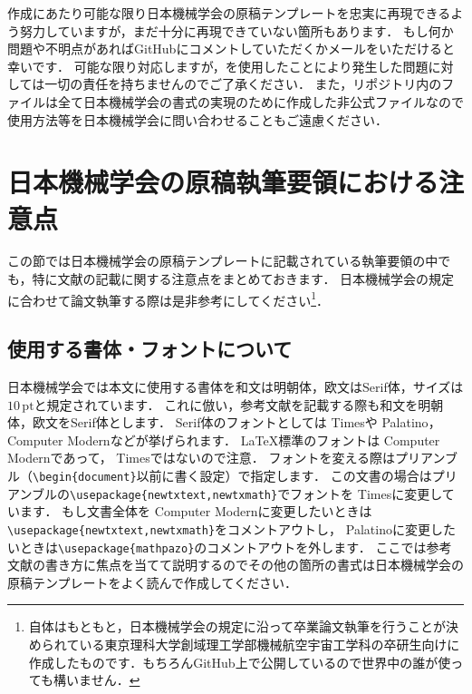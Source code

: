 \documentclass[a4paper,fleqn,uplatex,dvipdfmx]{jsarticle}
\begin{document}
\JSMErepos 作成にあたり可能な限り日本機械学会の原稿テンプレートを忠実に再現できるよう努力していますが，まだ十分に再現できていない箇所もあります．
もし何か問題や不明点があればGitHubにコメントしていただくかメールをいただけると幸いです．
可能な限り対応しますが，\JSMErepos を使用したことにより発生した問題に対しては一切の責任を持ちませんのでご了承ください．
また，\JSMErepos リポジトリ内のファイルは全て日本機械学会の書式の実現のために作成した非公式ファイルなので使用方法等を日本機械学会に問い合わせることもご遠慮ください．


\section{日本機械学会の原稿執筆要領における注意点}
\label{sec:caution}
この節では日本機械学会の原稿テンプレートに記載されている執筆要領の中でも，特に文献の記載に関する注意点をまとめておきます．
日本機械学会の規定に合わせて論文執筆する際は是非参考にしてください\footnote{\JSMErepos 自体はもともと，日本機械学会の規定に沿って卒業論文執筆を行うことが決められている東京理科大学創域理工学部機械航空宇宙工学科の卒研生向けに作成したものです．もちろんGitHub上で公開しているので世界中の誰が使っても構いません．}．

\subsection{使用する書体・フォントについて}
日本機械学会では本文に使用する書体を和文は明朝体，欧文はSerif体，サイズは$10\,\mathrm{pt}$と規定されています．
これに倣い，参考文献を記載する際も和文を明朝体，欧文をSerif体とします．
Serif体のフォントとしては{ Times}や{ Palatino}，{ Computer Modern}などが挙げられます．
\LaTeX{}標準のフォントは{ Computer Modern}であって，{ Times}ではないので注意．
フォントを変える際はプリアンブル（\verb|\begin{document}|以前に書く設定）で指定します．
この文書の場合はプリアンブルの\verb|\usepackage{newtxtext,newtxmath}|でフォントを{ Times}に変更しています．
もし文書全体を{ Computer Modern}に変更したいときは\verb|\usepackage{newtxtext,newtxmath}|をコメントアウトし，{ Palatino}に変更したいときは\verb|\usepackage{mathpazo}|のコメントアウトを外します．
ここでは参考文献の書き方に焦点を当てて説明するのでその他の箇所の書式は日本機械学会の原稿テンプレートをよく読んで作成してください．
\end{document}
